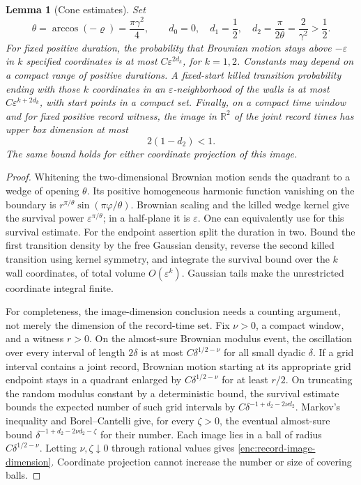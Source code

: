 \documentclass[11pt]{article}
\numberwithin{equation}{section}
\newtheorem{lemma}[theorem]{Lemma}
\theoremstyle{definition}
\theoremstyle{remark}
\newcommand{\1}{\mathbf 1}
\begin{document}
\begin{lemma}[Cone estimates]\label{enc:cone-estimates}
Set
\[
 \theta=\arccos(-\varrho)=\frac{\pi\gamma^2}{4},\qquad
 d_0=0,\quad d_1=\frac12,\quad d_2=\frac{\pi}{2\theta}
       =\frac2{\gamma^2}>\frac12.
\]
For fixed positive duration, the probability that Brownian motion stays
above $-\varepsilon$ in $k$ specified coordinates is at most
$C\varepsilon^{2d_k}$, for $k=1,2$.  Constants may depend on a compact
range of positive durations.  A fixed-start killed transition probability
ending with those $k$ coordinates in an $\varepsilon$-neighborhood of the
walls is at most $C\varepsilon^{k+2d_k}$, with start points in a compact
set.  Finally, on a compact time window and for fixed positive record
witness, the image in $\mathbb R^2$ of the joint record times has upper box
dimension at most
\begin{equation}\label{enc:record-image-dimension}
 2(1-d_2)<1.
\end{equation}
The same bound holds for either coordinate projection of this image.
\end{lemma}

\begin{proof}
Whitening the two-dimensional Brownian motion sends the quadrant to a
wedge of opening $\theta$.  Its positive homogeneous harmonic function
vanishing on the boundary is $r^{\pi/\theta}
\sin(\pi\varphi/\theta)$.  Brownian scaling and the killed wedge kernel
give the survival power $\varepsilon^{\pi/\theta}$; in a half-plane it
is $\varepsilon$.  One can equivalently use
\cite[Lemma 3.2]{GwynneMaoSunFKI} for this survival estimate.
For the endpoint assertion split the duration in two.  Bound the first
transition density by the free Gaussian density, reverse the second
killed transition using kernel symmetry, and integrate the survival
bound over the $k$ wall coordinates, of total volume $O(\varepsilon^k)$.
Gaussian tails make the unrestricted coordinate integral finite.

For completeness, the image-dimension conclusion needs a counting
argument, not merely the dimension of the record-time set.  Fix
$\nu>0$, a compact window, and a witness $r>0$.  On the almost-sure
Brownian modulus event, the oscillation over every interval of length
$2\delta$ is at most $C\delta^{1/2-\nu}$ for all small dyadic $\delta$.
If a grid interval contains a joint record, Brownian motion starting at
its appropriate grid endpoint stays in a quadrant enlarged by
$C\delta^{1/2-\nu}$ for at least $r/2$.  On truncating the random modulus
constant by a deterministic bound, the survival estimate bounds the
expected number of such grid intervals by
$C\delta^{-1+d_2-2\nu d_2}$.
Markov's inequality and Borel--Cantelli give, for every $\zeta>0$,
the eventual almost-sure bound
$\delta^{-1+d_2-2\nu d_2-\zeta}$ for their number.
Each image lies in a ball of radius
$C\delta^{1/2-\nu}$.  Letting $\nu,\zeta\downarrow0$ through rational values
gives \eqref{enc:record-image-dimension}.  Coordinate projection cannot
increase the number or size of covering balls.
\end{proof}
\end{document}
